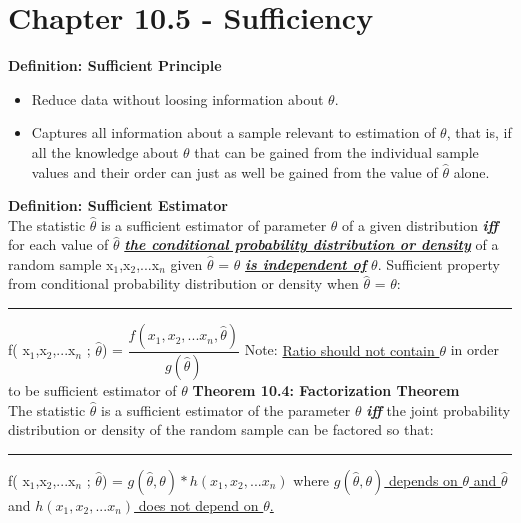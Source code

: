\documentclass[]{article}
\begin{document}
\section{Chapter 10.5 - Sufficiency}
\Large\textbf{Definition: Sufficient Principle}
\begin{itemize}
	\item Reduce data without loosing information about $\theta$.
	\item Captures all information about a sample relevant to estimation of $\theta$, that is, if all the knowledge about $\theta$ that can be gained from the individual sample values and their order can just as well be gained from the value of $\hat\theta$ alone. \newline
\end{itemize}
\Large\textbf{Definition: Sufficient Estimator}
\\
The statistic $\hat\theta$ is a sufficient estimator of parameter $\theta$ of a given distribution \textbf{\textit{iff}} for each value of $\hat\theta$ \ul{\textbf{\textit{the conditional probability distribution or density}}}  of a random sample x$_1$,x$_2$,...x$_n$ given $\hat\theta$ = $\theta$ \ul{\textbf{\textit{is independent of}}} $\theta$. 
\newline
\newline Sufficient property from conditional probability distribution or density when $\hat\theta$ = $\theta$:
\newline 
\newline\Large\rule{5cm}{0pt}  f( x$_1$,x$_2$,...x$_n$ ; $\hat\theta$) = $\dfrac{   f( x_1,x_2,...x_n , \hat\theta)  }{ g(\hat\theta) }$
\newline
\newline Note: \ul{Ratio should not contain $\theta$}  in order to be sufficient estimator of $\theta$
\newline
\newline
\newline
\Large\textbf{Theorem 10.4: Factorization Theorem}
\\
The statistic $\hat\theta$ is a sufficient estimator of the parameter $\theta$ \textbf{\textit{iff}} the joint probability distribution or density of the random sample can be factored so that:
\newline
\newline\Large\rule{5cm}{0pt}  f( x$_1$,x$_2$,...x$_n$ ; $\hat\theta$) = $g(\hat\theta, \theta) * h( x_1,x_2,...x_n )  $
\newline
\newline where \ul{$g(\hat\theta, \theta)$ depends on $\theta$ and $\hat\theta$}  and \ul{$h( x_1,x_2,...x_n )$ does not depend on $\theta$.} 
\end{document}
